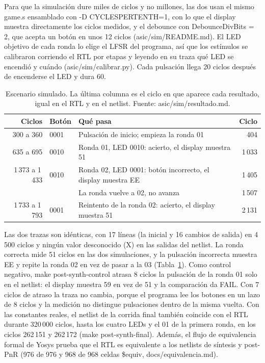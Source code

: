 \documentclass[11pt,a4paper]{article}
\DeclareRobustCommand{\sig}[1]{{\ttfamily\def\_{\textunderscore\allowbreak}#1}}
\begin{document}
Para que la simulación dure miles de ciclos y no millones, las dos usan el mismo \sig{game.s} ensamblado con \sig{-D CYCLES\_PER\_TENTH=1}, con lo que el display muestra directamente los ciclos medidos, y el debounce con \sig{DebounceDivBits = 2}, que acepta un botón en unos 12 ciclos (\sig{asic/sim/README.md}). El LED objetivo de cada ronda lo elige el LFSR del programa, así que los estímulos se calibraron corriendo el RTL por etapas y leyendo en su traza qué LED se encendió y cuándo (\sig{asic/sim/calibrar.py}). Cada pulsación llega 20 ciclos después de encenderse el LED y dura 60.

\begin{table}[!htb]
\centering\small
\begin{tabular}{@{}rlp{9.8cm}r@{}}
\toprule
\textbf{Ciclos} & \textbf{Botón} & \textbf{Qué pasa} & \textbf{Ciclo} \\
\midrule
300 a 360 & \sig{0001} & Pulsación de inicio; empieza la ronda 01 & 404 \\
635 a 695 & \sig{0010} & Ronda 01, LED \sig{0010}: acierto, el display muestra 51 & 1\,033 \\
1\,373 a 1\,433 & \sig{0010} & Ronda 02, LED \sig{0001}: botón incorrecto, el display muestra EE & 1\,405 \\
 & & La ronda vuelve a 02, no avanza & 1\,507 \\
1\,733 a 1\,793 & \sig{0001} & Reintento de la ronda 02: acierto, el display muestra 51 & 2\,131 \\
\bottomrule
\end{tabular}
\caption{Escenario simulado. La última columna es el ciclo en que aparece cada resultado, igual en el RTL y en el netlist. Fuente: \sig{asic/sim/resultado.md}.}
\label{tab:sim}
\end{table}

Las dos trazas son idénticas, con 17 líneas (la inicial y 16 cambios de salida) en 4\,500 ciclos y ningún valor desconocido (X) en las salidas del netlist. La ronda correcta mide 51 ciclos en las dos simulaciones, y la pulsación incorrecta muestra EE y repite la ronda 02 en vez de pasar a la 03 (Tabla~\ref{tab:sim}). Como control negativo, \sig{make post-synth-control} atrasa 8 ciclos la pulsación de la ronda 01 solo en el netlist: el display muestra 59 en vez de 51 y la comparación da FAIL. Con 7 ciclos de atraso la traza no cambia, porque el programa lee los botones en un lazo de 8 ciclos y la medición no distingue pulsaciones dentro de la misma vuelta. Con las constantes reales, el netlist de la corrida final también coincide con el RTL durante 320\,000 ciclos, hasta los cuatro LEDs y el 01 de la primera ronda, en los ciclos 262\,151 y 262\,172 (\sig{make post-synth-final}). Además, el flujo de equivalencia formal de Yosys prueba que el RTL es equivalente a los netlists de síntesis y post-PnR (976 de 976 y 968 de 968 celdas \sig{\$equiv}, \sig{docs/equivalencia.md}).
\end{document}
